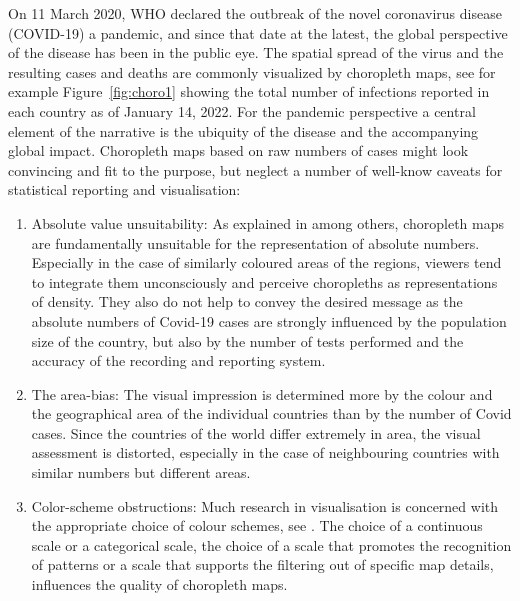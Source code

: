 \documentclass[article]{jdssv}\usepackage[]{graphicx}\usepackage[]{color}
\begin{document}
On 11 March 2020, WHO declared the outbreak of the novel coronavirus disease (COVID-19) a pandemic, and since that date at the latest, the global perspective of the disease has been in the public eye. The spatial spread of the virus and the resulting cases and deaths are commonly visualized by choropleth maps, see for example Figure~\ref{fig:choro1} showing the total number of infections reported in each country as of January 14, 2022. For the pandemic perspective a central element of the narrative is the ubiquity of the disease and the accompanying global impact. Choropleth maps based on raw numbers of cases might look convincing and fit to the purpose, but neglect a number of well-know caveats for statistical reporting and visualisation:
\begin{enumerate}
\item Absolute value unsuitability: As explained in \citep{monmonier2005, slocum2008, speckmann2010} among others, choropleth maps are fundamentally unsuitable for the representation of absolute numbers. Especially in the case of similarly coloured areas of the regions, viewers tend to integrate them unconsciously and perceive choropleths as representations of density. They also do not help to convey the desired message as the absolute numbers of Covid-19 cases are strongly influenced by the population size of the country, but also by the number of tests performed and the accuracy of the recording and reporting system.
\item The area-bias: The visual impression is determined more by the colour and the geographical area of the individual countries than by the number of Covid cases. Since the countries of the world differ extremely in area, the visual assessment is distorted, especially in the case of neighbouring countries with similar numbers but different areas.
\item Color-scheme obstructions: Much research in visualisation is concerned with the appropriate choice of colour schemes, see \citep{brewer1997}. The choice of a continuous scale or a categorical scale, the choice of a scale that promotes the recognition of patterns or a scale that supports the filtering out of specific map details, influences the quality of choropleth maps.  
\end{enumerate}
\end{document}
